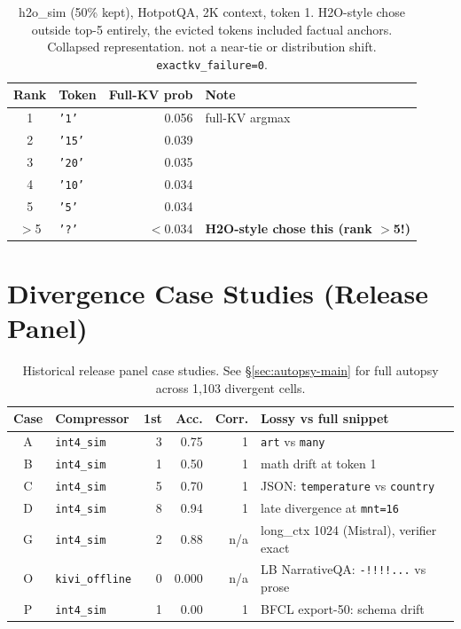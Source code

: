 \documentclass[11pt]{article}
\begin{document}
\begin{table}[H]
\centering\small
\begin{tabular}{clrl}
\toprule
\textbf{Rank} & \textbf{Token} & \textbf{Full-KV prob} & \textbf{Note} \\
\midrule
1 & \texttt{'1'} & 0.056 & full-KV argmax \\
2 & \texttt{'15'} & 0.039 & \\
3 & \texttt{'20'} & 0.035 & \\
4 & \texttt{'10'} & 0.034 & \\
5 & \texttt{'5'} & 0.034 & \\
$>$5 & \texttt{'?'} & $<$0.034 & \textbf{H2O-style chose this (rank $>$5!)} \\
\bottomrule
\end{tabular}
\caption{h2o\_sim (50\% kept), HotpotQA, 2K context, token 1. H2O-style chose outside
top-5 entirely, the evicted tokens included factual anchors. Collapsed representation. not a near-tie or distribution shift. \texttt{exactkv\_failure=0}.}
\end{table}

\section{Divergence Case Studies (Release Panel)}
\label{sec:release-cases}

\begin{table}[htbp]
\centering\footnotesize
\renewcommand{\arraystretch}{1.1}
\begin{tabularx}{\textwidth}{@{}clrrr>{\raggedright\arraybackslash}X@{}}
\toprule
\textbf{Case} & \textbf{Compressor} & \textbf{1st} & \textbf{Acc.} & \textbf{Corr.} & \textbf{Lossy vs full snippet} \\ \midrule
A & \texttt{int4\_sim} & 3 & 0.75 & 1 & \texttt{art} vs \texttt{many} \\
B & \texttt{int4\_sim} & 1 & 0.50 & 1 & math drift at token 1 \\
C & \texttt{int4\_sim} & 5 & 0.70 & 1 & JSON: \texttt{temperature} vs \texttt{country} \\
D & \texttt{int4\_sim} & 8 & 0.94 & 1 & late divergence at \texttt{mnt=16} \\
G & \texttt{int4\_sim} & 2 & 0.88 & n/a & long\_ctx 1024 (Mistral), verifier exact \\
O & \texttt{kivi\_offline} & 0 & 0.000 & n/a & LB NarrativeQA: \texttt{-!!!!...} vs prose \\
P & \texttt{int4\_sim} & 1 & 0.00 & 1 & BFCL export-50: schema drift \\
\bottomrule
\end{tabularx}
\caption{Historical release panel case studies. See \S\ref{sec:autopsy-main} for full
autopsy across 1,103 divergent cells.}
\end{table}
\end{document}
